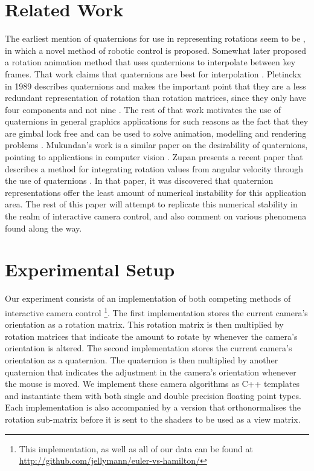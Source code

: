 \documentclass{acm_proc_article-sp}
\begin{document}
\section{Related Work}

The earliest mention of quaternions for use in representing rotations seem to be \cite{taylor79}, in which a novel method of robotic control is proposed.
Somewhat later \cite{schoemake85} proposed a rotation animation method that uses quaternions to interpolate between key frames.
That work claims that quaternions are best for interpolation \cite{schoemake85}.
Pletinckx in 1989 describes quaternions and makes the important point that they are a less redundant representation of rotation than rotation matrices, since they only have four components and not nine \cite{pletinckx89}.
The rest of that work motivates the use of quaternions in general graphics applications for such reasons as the fact that they are gimbal lock free \cite{pletinckx89} and can be used to solve animation, modelling and rendering problems \cite{pletinckx89}.
Mukundan's work is a similar paper on the desirability of quaternions, pointing to applications in computer vision \cite{mukundan02}.
Zupan presents a recent paper that describes a method for integrating rotation values from angular velocity through the use of quaternions \cite{zupan11}.
In that paper, it was discovered that quaternion representations offer the least amount of numerical instability for this application area.
The rest of this paper will attempt to replicate this numerical stability in the realm of interactive camera control, and also comment on various phenomena found along the way.

\section{Experimental Setup}

Our experiment consists of an implementation of both competing methods of interactive camera control \footnote{This implementation, as well as all of our data can be found at \url{http://github.com/jellymann/euler-vs-hamilton/}}.
The first implementation stores the current camera's orientation as a rotation matrix.
This rotation matrix is then multiplied by rotation matrices that indicate the amount to rotate by whenever the camera's orientation is altered.
The second implementation stores the current camera's orientation as a quaternion.
The quaternion is then multiplied by another quaternion that indicates the adjustment in the camera's orientation whenever the mouse is moved.
We implement these camera algorithms as C++ templates and instantiate them with both single and double precision floating point types.
Each implementation is also accompanied by a version that orthonormalises the rotation sub-matrix before it is sent to the shaders to be used as a view matrix.
\end{document}
